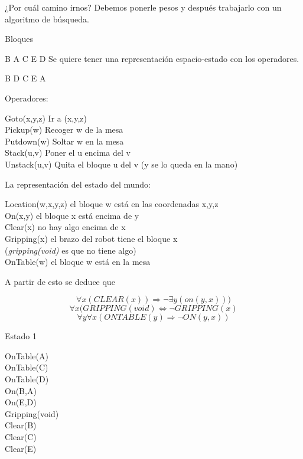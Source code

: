 ¿Por cuál camino irnos?
Debemos ponerle pesos y después trabajarlo con un algoritmo de búsqueda.


\begin{ejemplo}
	Bloques
	
	B	A	C	E	D
	Se quiere tener una representación espacio-estado con los operadores.
	
	B	D	C 	E	A
	
	
\end{ejemplo}

Operadores:


Goto(x,y,z) \hspace{0.5cm} Ir a (x,y,z) \\
Pickup(w) \hspace{0.5cm}Recoger w de la mesa \\
Putdown(w) \hspace{0.5cm}Soltar w en la mesa \\
Stack(u,v) \hspace{0.5cm}Poner el u encima del v \\
Unstack(u,v) \hspace{0.5cm} Quita el bloque u del v (y se lo queda en la mano)


La representación del estado del mundo:


Location(w,x,y,z) \hspace{0.5cm}  el bloque w está en las  coordenadas x,y,z \\
On(x,y) \hspace{0.5cm} el bloque x está encima de y \\
Clear(x) \hspace{0.5cm} no hay algo encima de x \\
Gripping(x) \hspace{0.5cm} el brazo del robot tiene el bloque x \\ (\textit{gripping(void)} es que no tiene algo) \\
OnTable(w) \hspace{0.5cm} el bloque w está en la mesa


A partir de esto se deduce que

$$\forall x (CLEAR(x)) \Rightarrow \neg \exists y (on(y,x)))$$
$$\forall x (GRIPPING (void) \Leftrightarrow \neg GRIPPING (x)$$
$$\forall y \forall x (ONTABLE (y) \Rightarrow \neg ON (y , x ))$$


Estado 1

	OnTable(A)\\
	OnTable(C)\\
	OnTable(D)\\
	On(B,A)\\
	On(E,D)\\
	Gripping(void) \\
	Clear(B) \\
	Clear(C) \\ 
	Clear(E)\\ 


